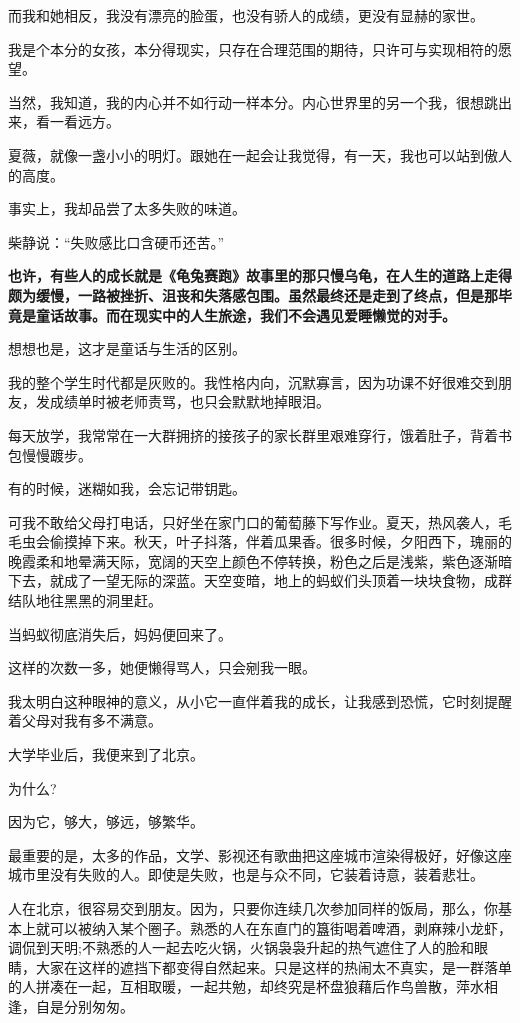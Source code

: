 \documentclass[UTF8,a4paper,8pt]{ctexbook}
\begin{document}
	 而我和她相反，我没有漂亮的脸蛋，也没有骄人的成绩，更没有显赫的家世。
	 
	 我是个本分的女孩，本分得现实，只存在合理范围的期待，只许可与实现相符的愿望。
	 
	 当然，我知道，我的内心并不如行动一样本分。内心世界里的另一个我，很想跳出来，看一看远方。
	 
	 夏薇，就像一盏小小的明灯。跟她在一起会让我觉得，有一天，我也可以站到傲人的高度。
	 
	 事实上，我却品尝了太多失败的味道。
	 
	 柴静说：“失败感比口含硬币还苦。”
	 
	 \textbf{也许，有些人的成长就是《龟兔赛跑》故事里的那只慢乌龟，在人生的道路上走得颇为缓慢，一路被挫折、沮丧和失落感包围。虽然最终还是走到了终点，但是那毕竟是童话故事。而在现实中的人生旅途，我们不会遇见爱睡懒觉的对手。}
	 
	 想想也是，这才是童话与生活的区别。
	 
	 我的整个学生时代都是灰败的。我性格内向，沉默寡言，因为功课不好很难交到朋友，发成绩单时被老师责骂，也只会默默地掉眼泪。
	 
	 每天放学，我常常在一大群拥挤的接孩子的家长群里艰难穿行，饿着肚子，背着书包慢慢踱步。
	 
	 有的时候，迷糊如我，会忘记带钥匙。
	 
	 可我不敢给父母打电话，只好坐在家门口的葡萄藤下写作业。夏天，热风袭人，毛毛虫会偷摸掉下来。秋天，叶子抖落，伴着瓜果香。很多时候，夕阳西下，瑰丽的晚霞柔和地晕满天际，宽阔的天空上颜色不停转换，粉色之后是浅紫，紫色逐渐暗下去，就成了一望无际的深蓝。天空变暗，地上的蚂蚁们头顶着一块块食物，成群结队地往黑黑的洞里赶。
	 
	 当蚂蚁彻底消失后，妈妈便回来了。
	 
	 这样的次数一多，她便懒得骂人，只会剜我一眼。
	 
	 我太明白这种眼神的意义，从小它一直伴着我的成长，让我感到恐慌，它时刻提醒着父母对我有多不满意。
	 
	 大学毕业后，我便来到了北京。
	 
	 为什么?
	 
	 因为它，够大，够远，够繁华。
	 
	 最重要的是，太多的作品，文学、影视还有歌曲把这座城市渲染得极好，好像这座城市里没有失败的人。即使是失败，也是与众不同，它装着诗意，装着悲壮。
	 
	 人在北京，很容易交到朋友。因为，只要你连续几次参加同样的饭局，那么，你基本上就可以被纳入某个圈子。熟悉的人在东直门的簋街喝着啤酒，剥麻辣小龙虾，调侃到天明;不熟悉的人一起去吃火锅，火锅袅袅升起的热气遮住了人的脸和眼睛，大家在这样的遮挡下都变得自然起来。只是这样的热闹太不真实，是一群落单的人拼凑在一起，互相取暖，一起共勉，却终究是杯盘狼藉后作鸟兽散，萍水相逢，自是分别匆匆。
	 
\end{document}
